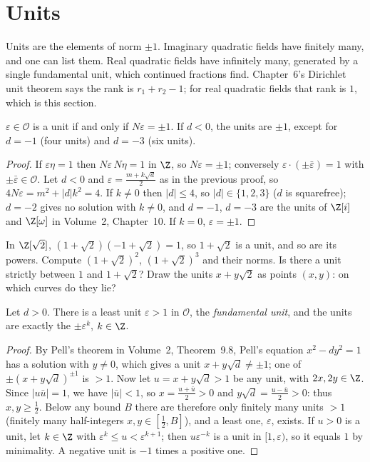\section{Units}

Units are the elements of norm $\pm 1$. Imaginary quadratic fields have finitely many, and one can list them. Real quadratic fields have infinitely many, generated by a single fundamental unit, which continued fractions find. Chapter~6's Dirichlet unit theorem says the rank is $r_1+r_2-1$; for real quadratic fields that rank is $1$, which is this section.

\begin{proposition}\label{prop:qunits}
$\varepsilon\in\mathcal O$ is a unit if and only if $N\varepsilon=\pm1$. If $d<0$, the units are $\pm1$, except for $d=-1$ (four units) and $d=-3$ (six units).
\end{proposition}
\begin{proof}
If $\varepsilon\eta=1$ then $N\varepsilon\,N\eta=1$ in $\Z$, so $N\varepsilon=\pm1$; conversely $\varepsilon\cdot(\pm\bar\varepsilon)=1$ with $\pm\bar\varepsilon\in\mathcal O$. Let $d<0$ and $\varepsilon=\frac{m+k\sqrt d}2$ as in the previous proof, so $4N\varepsilon=m^2+|d|k^2=4$. If $k\ne0$ then $|d|\le4$, so $|d|\in\{1,2,3\}$ ($d$ is squarefree); $d=-2$ gives no solution with $k\ne0$, and $d=-1$, $d=-3$ are the units of $\Z[i]$ and $\Z[\omega]$ in Volume~2, Chapter~10. If $k=0$, $\varepsilon=\pm1$.
\end{proof}

\begin{think}
In $\Z[\sqrt2]$, $(1+\sqrt2)(-1+\sqrt2)=1$, so $1+\sqrt2$ is a unit, and so are its powers. Compute $(1+\sqrt2)^2$, $(1+\sqrt2)^3$ and their norms. Is there a unit strictly between $1$ and $1+\sqrt2$? Draw the units $x+y\sqrt2$ as points $(x,y)$: on which curves do they lie?
\end{think}

\begin{theorem}\label{thm:realunits}
Let $d>0$. There is a least unit $\varepsilon>1$ in $\mathcal O$, the \emph{fundamental unit}, and the units are exactly the $\pm\varepsilon^k$, $k\in\Z$.
\end{theorem}
\begin{proof}
By Pell's theorem in Volume~2, Theorem~9.8, Pell's equation $x^2-dy^2=1$ has a solution with $y\ne0$, which gives a unit $x+y\sqrt d\ne\pm1$; one of $\pm(x+y\sqrt d)^{\pm1}$ is $>1$. Now let $u=x+y\sqrt d>1$ be any unit, with $2x,2y\in\Z$. Since $|u\bar u|=1$, we have $|\bar u|<1$, so $x=\frac{u+\bar u}2>0$ and $y\sqrt d=\frac{u-\bar u}2>0$: thus $x,y\ge\frac12$. Below any bound $B$ there are therefore only finitely many units $>1$ (finitely many half-integers $x,y\in\left[\frac12,B\right]$), and a least one, $\varepsilon$, exists. If $u>0$ is a unit, let $k\in\Z$ with $\varepsilon^k\le u<\varepsilon^{k+1}$; then $u\varepsilon^{-k}$ is a unit in $[1,\varepsilon)$, so it equals $1$ by minimality. A negative unit is $-1$ times a positive one.
\end{proof}

